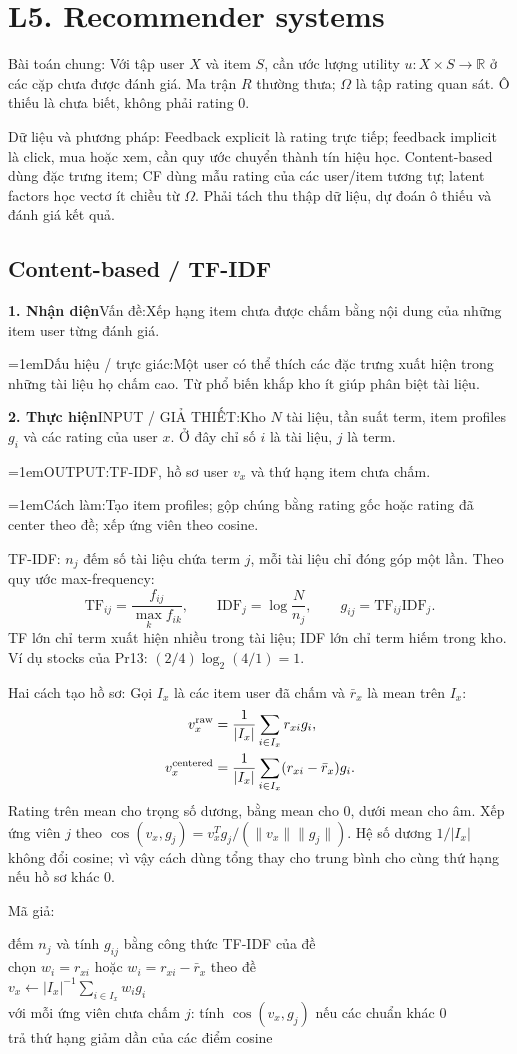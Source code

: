 \documentclass[10pt,a4paper,twocolumn]{article}
\makeatletter
\newcommand{\lecture}[2]{%
  \par
  \section{L#1. #2}\label{lecture:#1}}
\newif\ifexamheadingprinted
\newcommand{\topic}[2]{%
  \global\examheadingprintedfalse\par\subsection{#2}\label{topic:#1}}
\newcommand{\key}[1]{#1:\enspace}
\newcommand{\algfield}[2]{\par\noindent\hangindent=1em\relax#1:\enspace#2}
\newcommand{\unitfield}[4]{%
  \par\noindent\textbf{#1. #2}\enspace #3:\enspace #4}
\newcommand{\algsummary}[6]{%
  \begingroup\setlength{\parskip}{1pt}%
  \unitfield{1}{Nhận diện}{Vấn đề}{#1}%
  \algfield{Dấu hiệu / trực giác}{#2}%
  \if\relax\detokenize{#3}\relax\else\par\noindent#3\par\fi%
  \unitfield{2}{Thực hiện}{INPUT / GIẢ THIẾT}{#4}%
  \algfield{OUTPUT}{#5}%
  \algfield{Cách làm}{#6}\par\endgroup}
\newenvironment{algpseudo}{%
  \par\addvspace{2pt}\noindent
  \setlength{\parskip}{0pt}%
  Mã giả:\par\nobreak
  \begin{list}{}{\setlength{\leftmargin}{1em}\setlength{\topsep}{0pt}%
    \setlength{\partopsep}{0pt}\setlength{\parsep}{0pt}%
    \@beginparpenalty=10000\relax}%
  \item\relax
}{\end{list}\par\addvspace{3pt}}
\makeatother
\begin{document}
\lecture{5}{Recommender systems}

\key{Bài toán chung} Với tập user $X$ và item $S$, cần ước lượng utility $u:X\times S\to\mathbb R$ ở các cặp chưa được đánh giá. Ma trận $R$ thường thưa; $\Omega$ là tập rating quan sát. Ô thiếu là chưa biết, không phải rating 0.

\key{Dữ liệu và phương pháp} Feedback explicit là rating trực tiếp; feedback implicit là click, mua hoặc xem, cần quy ước chuyển thành tín hiệu học. Content-based dùng đặc trưng item; CF dùng mẫu rating của các user/item tương tự; latent factors học vectơ ít chiều từ $\Omega$. Phải tách thu thập dữ liệu, dự đoán ô thiếu và đánh giá kết quả.

\topic{tfidf}{Content-based / TF-IDF}

\algsummary{Xếp hạng item chưa được chấm bằng nội dung của những item user từng đánh giá.}{Một user có thể thích các đặc trưng xuất hiện trong những tài liệu họ chấm cao. Từ phổ biến khắp kho ít giúp phân biệt tài liệu.}{}{Kho $N$ tài liệu, tần suất term, item profiles $g_i$ và các rating của user $x$. Ở đây chỉ số $i$ là tài liệu, $j$ là term.}{TF-IDF, hồ sơ user $v_x$ và thứ hạng item chưa chấm.}{Tạo item profiles; gộp chúng bằng rating gốc hoặc rating đã center theo đề; xếp ứng viên theo cosine.}

\key{TF-IDF} $n_j$ đếm số tài liệu chứa term $j$, mỗi tài liệu chỉ đóng góp một lần. Theo quy ước max-frequency:
\[
\mathrm{TF}_{ij}=\frac{f_{ij}}{\max_k f_{ik}},\qquad
\mathrm{IDF}_j=\log\frac{N}{n_j},\qquad
g_{ij}=\mathrm{TF}_{ij}\mathrm{IDF}_j.
\]
TF lớn chỉ term xuất hiện nhiều trong tài liệu; IDF lớn chỉ term hiếm trong kho. Ví dụ stocks của Pr13: $(2/4)\log_2(4/1)=1$.

\key{Hai cách tạo hồ sơ} Gọi $I_x$ là các item user đã chấm và $\bar r_x$ là mean trên $I_x$:
\begin{align*}
v_x^{\rm raw}&=\frac1{|I_x|}\sum_{i\in I_x}r_{xi}g_i,\\
v_x^{\rm centered}&=\frac1{|I_x|}\sum_{i\in I_x}(r_{xi}-\bar r_x)g_i.
\end{align*}
Rating trên mean cho trọng số dương, bằng mean cho 0, dưới mean cho âm. Xếp ứng viên $j$ theo $\cos(v_x,g_j)=v_x^Tg_j/(\|v_x\|\|g_j\|)$. Hệ số dương $1/|I_x|$ không đổi cosine; vì vậy cách dùng tổng thay cho trung bình cho cùng thứ hạng nếu hồ sơ khác 0.

\begin{algpseudo}
đếm $n_j$ và tính $g_{ij}$ bằng công thức TF-IDF của đề\\
chọn $w_i=r_{xi}$ hoặc $w_i=r_{xi}-\bar r_x$ theo đề\\
$v_x\gets |I_x|^{-1}\sum_{i\in I_x}w_i g_i$\\
với mỗi ứng viên chưa chấm $j$: tính $\cos(v_x,g_j)$ nếu các chuẩn khác 0\\
trả thứ hạng giảm dần của các điểm cosine
\end{algpseudo}
\end{document}
